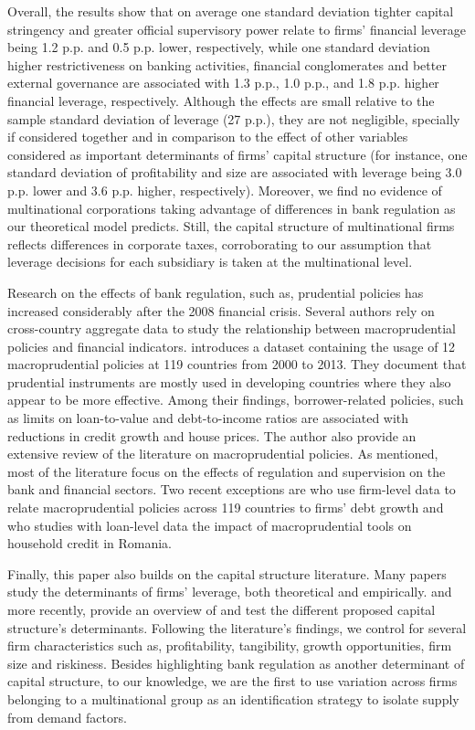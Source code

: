 \documentclass[12pt]{article}
\begin{document}
	Overall, the results show that on average one standard deviation tighter capital stringency and greater official supervisory power relate to firms' financial leverage being 1.2 p.p. and
	0.5 p.p. lower, respectively, while one standard deviation higher restrictiveness on banking activities, financial conglomerates and better external governance are associated with 1.3 p.p., 1.0 p.p., and 1.8 p.p. higher financial leverage, respectively. Although the effects are small relative to the sample standard deviation of leverage (27 p.p.), they are not negligible, specially if considered together and in comparison to the effect of other variables considered as important determinants of firms' capital structure (for instance, one standard deviation of profitability and size are associated with leverage being 3.0 p.p. lower and 3.6 p.p. higher, respectively). Moreover, we find no evidence of multinational corporations taking advantage of differences in bank regulation as our theoretical model predicts. Still, the capital structure of multinational firms reflects differences in corporate taxes, corroborating to our assumption that leverage decisions for each subsidiary is taken at the multinational level. 
	
	Research on the effects of bank regulation, such as, prudential policies has increased considerably after the 2008 financial crisis. Several authors rely on cross-country aggregate data to study the relationship between macroprudential policies and financial indicators. \cite*{cerutti2015use} introduces a dataset containing the usage of 12 macroprudential policies at 119 countries from 2000 to 2013. They document that prudential instruments are mostly used in developing countries where they also appear to be more effective. Among their findings, borrower-related policies, such as limits on loan-to-value and debt-to-income ratios are associated with reductions in credit growth and house prices. The author also provide an extensive review of the literature on macroprudential policies. As mentioned, most of the literature focus on the effects of regulation and supervision on the bank and financial sectors. Two recent exceptions are \cite*{ayyagari2017credit} who use firm-level data to relate macroprudential policies across 119 countries to firms' debt growth and \cite*{epure2017household} who studies with loan-level data the impact of macroprudential tools on household credit in Romania.    
	
	Finally, this paper also builds on the capital structure literature. Many papers study the determinants of firms' leverage, both theoretical and empirically. \cite*{titman1988determinants} and more recently, \cite*{oztekin2015capital} provide an overview of and test the different proposed capital structure's determinants. Following the literature's findings, we control for several firm characteristics such as, profitability, tangibility, growth opportunities, firm size and riskiness. Besides highlighting bank regulation as another determinant of capital structure, to our knowledge, we are the first to use variation across firms belonging to a multinational group as an identification strategy to isolate supply from demand factors.          
	
\end{document}
